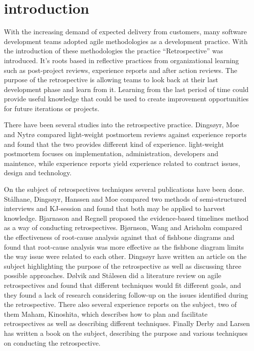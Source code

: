 \documentclass[lnbip]{svmultln}
\begin{document}
\begin{abstract}
\end{abstract}

\section{introduction}
With the increasing demand of expected delivery from customers, many software development teams adopted agile methodologies as a development practice. With the introduction of these methodologies the practice ``Retrospective'' was introduced. It's roots based in reflective practices from organizational learning such as post-project reviews, experience reports and after action reviews. The purpose of the retrospective is allowing teams to look back at their last development phase and learn from it. Learning from the last period of time could provide useful knowledge that could be used to create improvement opportunities for future iterations or projects.

There have been several studies into the retrospective practice. Dingsøyr, Moe and Nytrø compared light-weight postmortem reviews against experience reports and found that the two provides different kind of experience. light-weight postmortem focuses on implementation, administration, developers and maintence, while experience reports yield experience related to contract issues, design and technology.

On the subject of retrospectives techniques several publications have been done. Stålhane, Dingsøyr, Hanssen and Moe\cite{Hanssen2003} compared two methods of semi-structured interviews and KJ-session and found that both may be applied to harvest knowledge. Bjarnason and Regnell\cite{Bjarnason2012} proposed the evidence-based timelines method as a way of conducting retrospectives. Bjørnson, Wang and Arisholm\cite{bjornson2009} compared the effectiveness of root-cause analysis against that of fishbone diagrams and found that root-cause analysis was more effective as the fishbone diagram limits the way issue were related to each other. Dingsøyr\cite{Dingsoyr2004} have written an article on the subject highlighting the purpose of the retrospective as well as discussing three possible approaches. Dølvik and Stålesen\cite{Dolvik2014} did a literature review on agile retrospectives and found that different techniques would fit different goals, and they found a lack of research considering follow-up on the issues identified during the retrospective. There also several experience reports on the subject, two of them Maham\cite{Maham2008}, Kinoshita\cite{Kinoshita2008}, which describes how to plan and facilitate retrospectives as well as describing different techniques. Finally Derby and Larsen\cite{Larsen2006} has written a book on the subject, describing the purpose and various techniques on conducting the retrospective.
\end{document}

